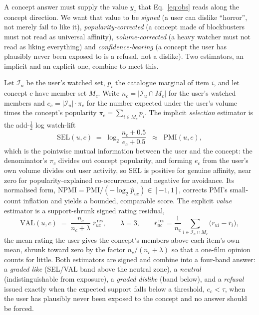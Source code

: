 \documentclass[manuscript,screen,review]{acmart}
\begin{document}
A concept answer must supply the value $y_c$ that Eq.~\eqref{eq:obs} reads along the concept direction. We want that value to be \emph{signed} (a user can dislike ``horror'', not merely fail to like it), \emph{popularity-corrected} (a concept made of blockbusters must not read as universal affinity), \emph{volume-corrected} (a heavy watcher must not read as liking everything) and \emph{confidence-bearing} (a concept the user has plausibly never been exposed to is a refusal, not a dislike). Two estimators, an implicit and an explicit one, combine to meet this.

Let $\mathcal I_u$ be the user's watched set, $p_i$ the catalogue marginal of item $i$, and let concept $c$ have member set $M_c$. Write $n_c=|\mathcal I_u\cap M_c|$ for the user's watched members and $e_c=|\mathcal I_u|\cdot\pi_c$ for the number expected under the user's volume times the concept's popularity $\pi_c=\sum_{i\in M_c}p_i$. The implicit \emph{selection} estimator is the add-$\tfrac12$ log watch-lift
\begin{equation}\label{eq:sel}
  \mathrm{SEL}(u,c) \;=\; \log_2\frac{n_c+0.5}{e_c+0.5}
  \;\;\approx\;\; \mathrm{PMI}(u,c),
\end{equation}
which is the pointwise mutual information between the user and the concept: the denominator's $\pi_c$ divides out concept popularity, and forming $e_c$ from the user's own volume divides out user activity, so SEL is positive for genuine affinity, near zero for popularity-explained co-occurrence, and negative for avoidance. Its normalised form, $\mathrm{NPMI}=\mathrm{PMI}/(-\log_2 \hat p_{uc})\in[-1,1]$, corrects PMI's small-count inflation and yields a bounded, comparable score. The explicit \emph{value} estimator is a support-shrunk signed rating residual,
\begin{equation}\label{eq:val}
  \mathrm{VAL}(u,c) \;=\; \frac{n_c}{n_c+\lambda}\;\bar r^{\,\mathrm{res}}_{uc},
  \qquad \lambda=3,\qquad
  \bar r^{\,\mathrm{res}}_{uc}=\frac{1}{n_c}\!\!\sum_{i\in\mathcal I_u\cap M_c}\!\!\bigl(r_{ui}-\bar r_i\bigr),
\end{equation}
the mean rating the user gives the concept's members above each item's own mean, shrunk toward zero by the factor $n_c/(n_c+\lambda)$ so that a one-film opinion counts for little. Both estimators are signed and combine into a four-band answer: a \emph{graded like} (SEL/VAL band above the neutral zone), a \emph{neutral} (indistinguishable from exposure), a \emph{graded dislike} (band below), and a \emph{refusal} issued exactly when the expected support falls below a threshold, $e_c<\tau$, when the user has plausibly never been exposed to the concept and no answer should be forced.
\end{document}
